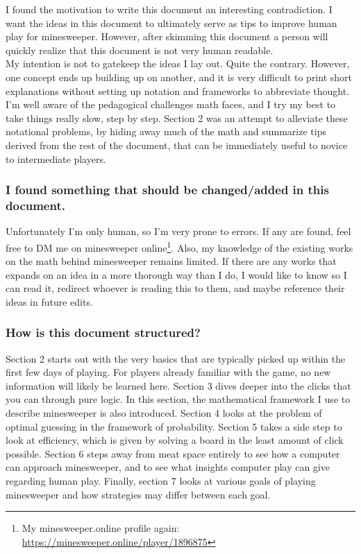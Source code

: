 I found the motivation to write this document an interesting contradiction. I want the ideas in this document to ultimately serve as tips to improve human play for minesweeper. However, after skimming this document a person will quickly realize that this document is not very human readable.\\

My intention is not to gatekeep the ideas I lay out. Quite the contrary. However, one concept ends up building up on another, and it is very difficult to print short explanations without setting up notation and frameworks to abbreviate thought. I'm well aware of the pedagogical challenges math faces, and I try my best to take things really slow, step by step. Section 2 was an attempt to alleviate these notational problems, by hiding away much of the math and summarize tips derived from the rest of the document, that can be immediately useful to novice to intermediate players.\\

\subsubsection*{I found something that should be changed/added in this document.}

Unfortunately I'm only human, so I'm very prone to errors. If any are found, feel free to DM me on minesweeper online\footnote{My minesweeper.online profile again: \url{https://minesweeper.online/player/1896875}}. Also, my knowledge of the existing works on the math behind minesweeper remains limited. If there are any works that expands on an idea in a more thorough way than I do, I would like to know so I can read it, redirect whoever is reading this to them, and maybe reference their ideas in future edits.\\

\subsubsection*{How is this document structured?}

Section 2 starts out with the very basics that are typically picked up within the first few days of playing. For players already familiar with the game, no new information will likely be learned here. Section 3 dives deeper into the clicks that you can through pure logic. In this section, the mathematical framework I use to describe minesweeper is also introduced. Section 4 looks at the problem of optimal guessing in the framework of probability. Section 5 takes a side step to look at efficiency, which is given by solving a board in the least amount of click possible. Section 6 steps away from meat space entirely to see how a computer can approach minesweeper, and to see what insights computer play can give regarding human play. Finally, section 7 looks at various goals of playing minesweeper and how strategies may differ between each goal.\\

